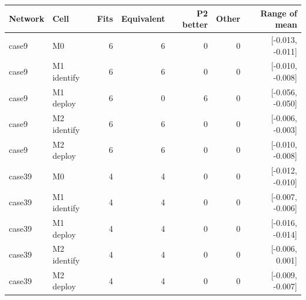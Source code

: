 \begin{tabular}{llrrrrr}\toprule
Network & Cell & Fits & Equivalent & P2 better & Other & Range of mean\\\midrule
case9 & M0 & 6 & 6 & 0 & 0 & [-0.013, -0.011]\\
case9 & M1 identify & 6 & 6 & 0 & 0 & [-0.010, -0.008]\\
case9 & M1 deploy & 6 & 0 & 6 & 0 & [-0.056, -0.050]\\
case9 & M2 identify & 6 & 6 & 0 & 0 & [-0.006, -0.003]\\
case9 & M2 deploy & 6 & 6 & 0 & 0 & [-0.010, -0.008]\\
case39 & M0 & 4 & 4 & 0 & 0 & [-0.012, -0.010]\\
case39 & M1 identify & 4 & 4 & 0 & 0 & [-0.007, -0.006]\\
case39 & M1 deploy & 4 & 4 & 0 & 0 & [-0.016, -0.014]\\
case39 & M2 identify & 4 & 4 & 0 & 0 & [-0.006, 0.001]\\
case39 & M2 deploy & 4 & 4 & 0 & 0 & [-0.009, -0.007]\\
\bottomrule\end{tabular}
